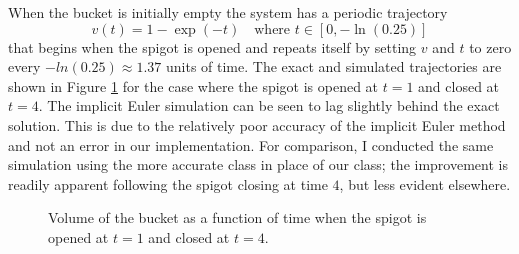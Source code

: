 When the bucket is initially empty the system has a periodic trajectory
\begin{equation*}
v(t) = 
1-\exp(-t)  \quad \text{where } t \in [0,-\ln(0.25)]
\end{equation*}
that begins when the spigot is opened and repeats itself by setting $v$ and $t$ to zero every $-ln(0.25) \approx 1.37$ units of time.
The exact and simulated trajectories are shown in Figure \ref{fig:bucket} for the case where the spigot is opened at $t=1$ and closed at $t=4$. The implicit Euler simulation can be seen to lag slightly behind the exact solution. This is due to the relatively poor accuracy of the implicit Euler method and not an error in our implementation. For comparison, I conducted the same simulation using the more accurate  class in place of our  class; the improvement is readily apparent following the spigot closing at time $4$, but less evident elsewhere.
\begin{figure}[ht]
\centering
{}
\caption{Volume of the bucket as a function of time when the spigot is opened at $t=1$ and closed at $t=4$.}
\label{fig:bucket}
\end{figure}
